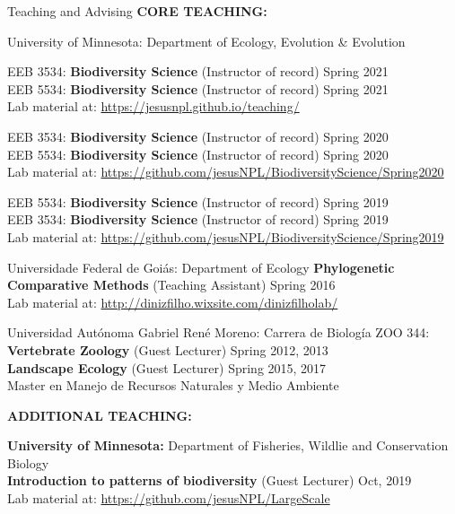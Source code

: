 \documentclass{resume} %
\begin{document}
\begin{rSection}{Teaching and Advising}
\textbf{CORE TEACHING:}

\begin{reSubsection}{University of Minnesota: }{Department of Ecology, Evolution \& Evolution }{}{
EEB 3534: \textbf{Biodiversity Science} (Instructor of record) \hfill Spring 2021 \\ 
EEB 5534: \textbf{Biodiversity Science} (Instructor of record) \hfill Spring 2021 \\ 
{Lab material at:
\url{https://jesusnpl.github.io/teaching/}}\smallskip

EEB 3534: \textbf{Biodiversity Science} (Instructor of record) \hfill Spring 2020 \\ 
EEB 5534: \textbf{Biodiversity Science} (Instructor of record) \hfill Spring 2020 \\ 
{Lab material at:
\url{https://github.com/jesusNPL/BiodiversityScience/Spring2020}}\smallskip 

EEB 5534: \textbf{Biodiversity Science} (Instructor of record) \hfill Spring 2019 \\  
EEB 3534: \textbf{Biodiversity Science} (Instructor of record) \hfill Spring 2019 \\ 
{Lab material at:
\url{https://github.com/jesusNPL/BiodiversityScience/Spring2019}}\smallskip 
}
\end{reSubsection}

\begin{reSubsection}{Universidade Federal de Goiás: }{Department of Ecology }{}{
\textbf{Phylogenetic Comparative Methods} (Teaching Assistant) \hfill Spring 2016 \\ 
{Lab material at:
\url{http://dinizfilho.wixsite.com/dinizfilholab/}}\smallskip 
} 
\end{reSubsection}

\begin{reSubsection}{Universidad Autónoma Gabriel René Moreno: }{Carrera de Biología }{}{
ZOO 344: \textbf{Vertebrate Zoology} (Guest Lecturer) \hfill Spring 2012, 2013 \\ \textbf{Landscape Ecology} (Guest Lecturer) \hfill Spring 2015, 2017 \\
{Master en Manejo de Recursos Naturales y Medio Ambiente} \smallskip 
} 
\end{reSubsection}

\textbf{ADDITIONAL TEACHING:}

{\bf University of Minnesota: }{Department of Fisheries, Wildlie and Conservation Biology } \\
\textbf{Introduction to patterns of biodiversity} (Guest Lecturer) \hfill Oct, 2019 \\
{Lab material at:
\url{https://github.com/jesusNPL/LargeScale}}\smallskip 


\end{rSection}
\end{document}

